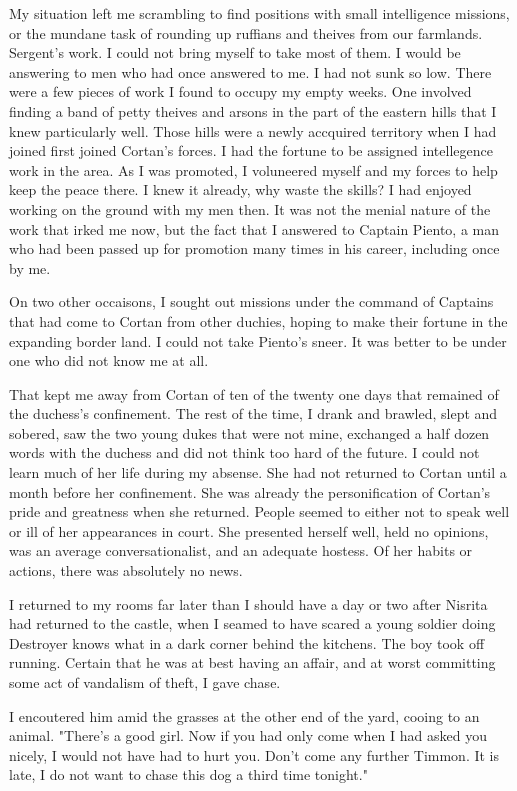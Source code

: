 \documentclass{article}
\begin{document}
My situation left me scrambling to find positions with small intelligence missions, or the mundane task of rounding up ruffians and theives from our farmlands. Sergent's work. I could not bring myself to take most of them. I would be answering to men who had once answered to me. I had not sunk so low. There were a few pieces of work I found to occupy my empty weeks. One involved finding a band of petty theives and arsons in the part of the eastern hills that I knew particularly well. Those hills were a newly accquired territory when I had joined first joined Cortan's forces. I had the fortune to be assigned intellegence work in the area. As I was promoted, I voluneered myself and my forces to help keep the peace there. I knew it already, why waste the skills? I had enjoyed working on the ground with my men then. It was not the menial nature of the work that irked me now, but the fact that I answered to Captain Piento, a man who had been passed up for promotion many times in his career, including once by me.

On two other occaisons, I sought out missions under the command of Captains that had come to Cortan from other duchies, hoping to make their fortune in the expanding border land. I could not take Piento's sneer. It was better to be under one who did not know me at all.

That kept me away from Cortan of ten of the twenty one days that remained of the duchess's confinement. The rest of the time, I drank and brawled, slept and sobered, saw the two young dukes that were not mine, exchanged a half dozen words with the duchess and did not think too hard of the future. I could not learn much of her life during my absense. She had not returned to Cortan until a month before her confinement. She was already the personification of Cortan's pride and greatness when she returned. People seemed to either not to speak well or ill of her appearances in court. She presented herself well, held no opinions, was an average conversationalist, and an adequate hostess. Of her habits or actions, there was absolutely no news.

I returned to my rooms far later than I should have a day or two after Nisrita had returned to the castle, when I seamed to have scared a young soldier doing Destroyer knows what in a dark corner behind the kitchens. The boy took off running. Certain that he was at best having an affair, and at worst committing some act of vandalism of theft, I gave chase. 

I encoutered him amid the grasses at the other end of the yard, cooing to an animal. "There's a good girl. Now if you had only come when I had asked you nicely, I would not have had to hurt you. Don't come any further Timmon. It is late, I do not want to chase this dog a third time tonight."
\end{document}
